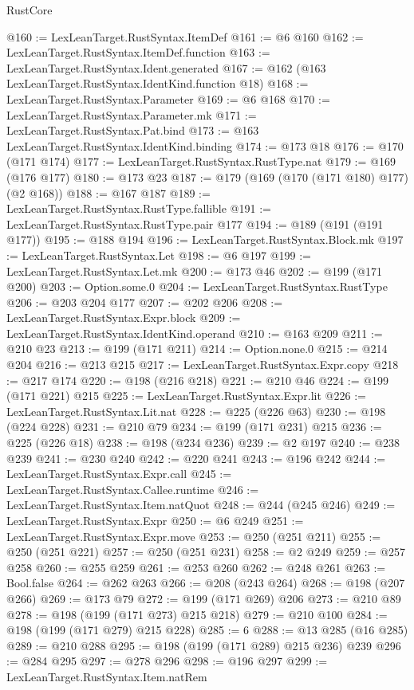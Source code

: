 \begin{lexlean}{RustCore}
\begin{coremodule}
@160 := LexLeanTarget.RustSyntax.ItemDef
@161 := @6 @160
@162 := LexLeanTarget.RustSyntax.ItemDef.function
@163 := LexLeanTarget.RustSyntax.Ident.generated
@167 := @162 (@163 LexLeanTarget.RustSyntax.IdentKind.function @18)
@168 := LexLeanTarget.RustSyntax.Parameter
@169 := @6 @168
@170 := LexLeanTarget.RustSyntax.Parameter.mk
@171 := LexLeanTarget.RustSyntax.Pat.bind
@173 := @163 LexLeanTarget.RustSyntax.IdentKind.binding
@174 := @173 @18
@176 := @170 (@171 @174)
@177 := LexLeanTarget.RustSyntax.RustType.nat
@179 := @169 (@176 @177)
@180 := @173 @23
@187 := @179 (@169 (@170 (@171 @180) @177) (@2 @168))
@188 := @167 @187
@189 := LexLeanTarget.RustSyntax.RustType.fallible
@191 := LexLeanTarget.RustSyntax.RustType.pair @177
@194 := @189 (@191 (@191 @177))
@195 := @188 @194
@196 := LexLeanTarget.RustSyntax.Block.mk
@197 := LexLeanTarget.RustSyntax.Let
@198 := @6 @197
@199 := LexLeanTarget.RustSyntax.Let.mk
@200 := @173 @46
@202 := @199 (@171 @200)
@203 := Option.some.{0}
@204 := LexLeanTarget.RustSyntax.RustType
@206 := @203 @204 @177
@207 := @202 @206
@208 := LexLeanTarget.RustSyntax.Expr.block
@209 := LexLeanTarget.RustSyntax.IdentKind.operand
@210 := @163 @209
@211 := @210 @23
@213 := @199 (@171 @211)
@214 := Option.none.{0}
@215 := @214 @204
@216 := @213 @215
@217 := LexLeanTarget.RustSyntax.Expr.copy
@218 := @217 @174
@220 := @198 (@216 @218)
@221 := @210 @46
@224 := @199 (@171 @221) @215
@225 := LexLeanTarget.RustSyntax.Expr.lit
@226 := LexLeanTarget.RustSyntax.Lit.nat
@228 := @225 (@226 @63)
@230 := @198 (@224 @228)
@231 := @210 @79
@234 := @199 (@171 @231) @215
@236 := @225 (@226 @18)
@238 := @198 (@234 @236)
@239 := @2 @197
@240 := @238 @239
@241 := @230 @240
@242 := @220 @241
@243 := @196 @242
@244 := LexLeanTarget.RustSyntax.Expr.call
@245 := LexLeanTarget.RustSyntax.Callee.runtime
@246 := LexLeanTarget.RustSyntax.Item.natQuot
@248 := @244 (@245 @246)
@249 := LexLeanTarget.RustSyntax.Expr
@250 := @6 @249
@251 := LexLeanTarget.RustSyntax.Expr.move
@253 := @250 (@251 @211)
@255 := @250 (@251 @221)
@257 := @250 (@251 @231)
@258 := @2 @249
@259 := @257 @258
@260 := @255 @259
@261 := @253 @260
@262 := @248 @261
@263 := Bool.false
@264 := @262 @263
@266 := @208 (@243 @264)
@268 := @198 (@207 @266)
@269 := @173 @79
@272 := @199 (@171 @269) @206
@273 := @210 @89
@278 := @198 (@199 (@171 @273) @215 @218)
@279 := @210 @100
@284 := @198 (@199 (@171 @279) @215 @228)
@285 := 6
@288 := @13 @285 (@16 @285)
@289 := @210 @288
@295 := @198 (@199 (@171 @289) @215 @236) @239
@296 := @284 @295
@297 := @278 @296
@298 := @196 @297
@299 := LexLeanTarget.RustSyntax.Item.natRem

\end{coremodule}
\end{lexlean}
